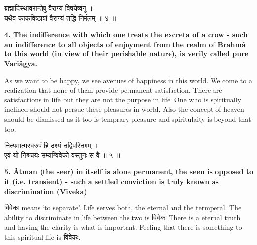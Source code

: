 \documentclass{article}
\begin{document}
\begin{large}
\begin{center}
    \begin{hindi}
	ब्रह्मादिस्थावरान्तेषु वैराग्यं विषयेष्वनु ।\\
	यथैव काकविष्ठायां वैराग्यं तद्धि निर्मलम् ॥ ४ ॥
    \end{hindi}
\end{center}
\end{large}

\textbf{4. The indifference with which one treats the excreta of a crow - such an
indifference to all objects of enjoyment from the realm of Brahmâ to this
world (in view of their perishable nature), is verily called pure Variâgya.
}

\smallskip

\begin{oframed}
As we want to be happy, we see avenues of happiness in this world. We come to a
realization that none of them provide permanent satisfaction. There are
satisfactions in life but they are not the purpose in life. One who is
spiritually inclined should not persue these pleasures in world. Also the
concept of heaven should be dismissed as it too is temprary pleasure and
spiritulaity is beyond that too.
\end{oframed}




\begin{large}
\begin{center}
    \begin{hindi}
	नित्यमात्मस्वरुपं हि द्रश्यं तद्विपरितगम् ।\\
	एवं यो निश्र्चयः सम्यग्विवेको वस्तुनः स वै ॥ ५ ॥
    \end{hindi}
\end{center}
\end{large}

\textbf{5. Âtman (the seer) in itself is alone permanent, the seen is opposed
to it (i.e. transient) - such a settled conviction is truly known as discrimination (Viveka)
}

\begin{oframed}
\texthindi{विवेकः}
means `to separate'.  Life serves both, the eternal and the termperal.
The ability to discriminate in life between the two is
\texthindi{विवेकः}
There is a eternal truth and having the clarity is what is important. Feeling
that there is something to this spiritual life is 
\texthindi{विवेकः}.
\end{oframed}
\end{document}
